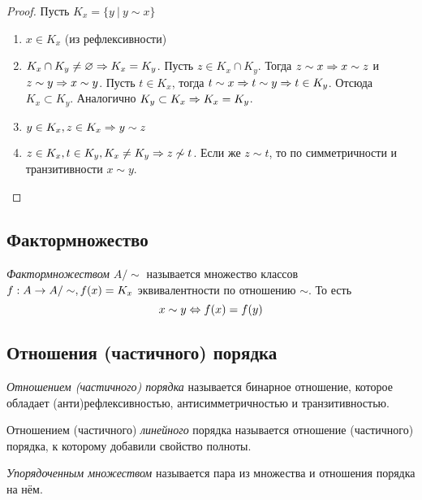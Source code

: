 \begin{proof}
	Пусть $K_x = \{y\ |\ y \sim x\}$
	
	\begin{enumerate}
		\item $x \in K_x$ (из рефлексивности)
		\item $K_x \cap K_y \neq \varnothing \Rightarrow K_x = K_y$. Пусть $z \in K_x \cap K_y$. Тогда $z \sim x \Rightarrow x \sim z$ и $z \sim y \Rightarrow x \sim y$. Пусть $t \in K_x$, тогда $t \sim x \Rightarrow t \sim y \Rightarrow t \in K_y$. Отсюда $K_x \subset K_y$. Аналогично $K_y \subset K_x \Rightarrow K_x = K_y$.
		\item $y \in K_x, z \in K_x \Rightarrow y \sim z$
		\item $z \in K_x, t \in K_y, K_x \neq K_y \Rightarrow z \not\sim t$. Если же $z \sim t$, то по симметричности и транзитивности $x \sim y$.
	\end{enumerate}
\end{proof}

\subsection{Фактормножество}

\begin{definition}
	\textit{Фактормножеством} $A/\sim$ называется множество классов $f : A \rightarrow A/\sim, f(x) = K_x$ эквивалентности по отношению $\sim$. То есть
	$$
		x \sim y \Leftrightarrow f(x) = f(y)
	$$
\end{definition}

\subsection{Отношения (частичного) порядка}

\begin{definition}
	\textit{Отношением (частичного) порядка} называется бинарное отношение, которое обладает (анти)рефлексивностью, антисимметричностью и транзитивностью.
\end{definition}

\begin{definition}
	Отношением (частичного) \textit{линейного} порядка называется отношение (частичного) порядка, к которому добавили свойство полноты.
\end{definition}

\begin{definition}
	\textit{Упорядоченным множеством} называется пара из множества и отношения порядка на нём.
\end{definition}

